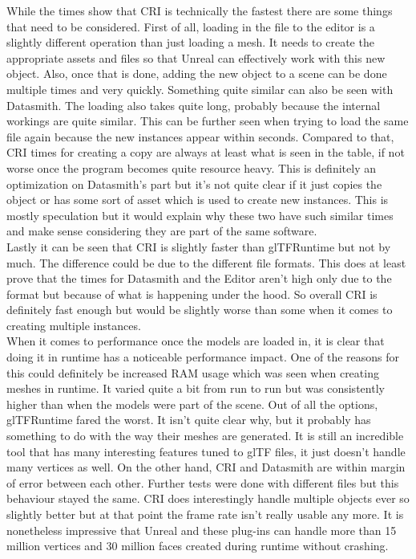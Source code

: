 While the times show that \acs{CRI} is technically the fastest there are some things that need to be considered. First of all, loading in the file to the editor is a slightly different operation than just loading a mesh. It needs to create the appropriate assets and files so that Unreal can effectively work with this new object. Also, once that is done, adding the new object to a scene can be done multiple times and very quickly. Something quite similar can also be seen with Datasmith. The loading also takes quite long, probably because the internal workings are quite similar. This can be further seen when trying to load the same file again because the new instances appear within seconds. Compared to that, CRI times for creating a copy are always at least what is seen in the table, if not worse once the program becomes quite resource heavy. This is definitely an optimization on Datasmith's part but it's not quite clear if it just copies the object or has some sort of asset which is used to create new instances. This is mostly speculation but it would explain why these two have such similar times and make sense considering they are part of the same software.\\
Lastly it can be seen that \acs{CRI} is slightly faster than glTFRuntime but not by much. The difference could be due to the different file formats. This does at least prove that the times for Datasmith and the Editor aren't high only due to the format but because of what is happening under the hood. So overall \acs{CRI} is definitely fast enough but would be slightly worse than some when it comes to creating multiple instances.\\

When it comes to performance once the models are loaded in, it is clear that doing it in runtime has a noticeable performance impact. One of the reasons for this could definitely be increased RAM usage which was seen when creating meshes in runtime. It varied quite a bit from run to run but was consistently higher than when the models were part of the scene. Out of all the options, glTFRuntime fared the worst. It isn't quite clear why, but it probably has something to do with the way their meshes are generated. It is still an incredible tool that has many interesting features tuned to glTF files, it just doesn't handle many vertices as well. On the other hand, CRI and Datasmith are within margin of error between each other. Further tests were done with different files but this behaviour stayed the same. CRI does interestingly handle multiple objects ever so slightly better but at that point the frame rate isn't really usable any more. It is nonetheless impressive that Unreal and these plug-ins can handle more than 15 million vertices and 30 million faces created during runtime without crashing. 


